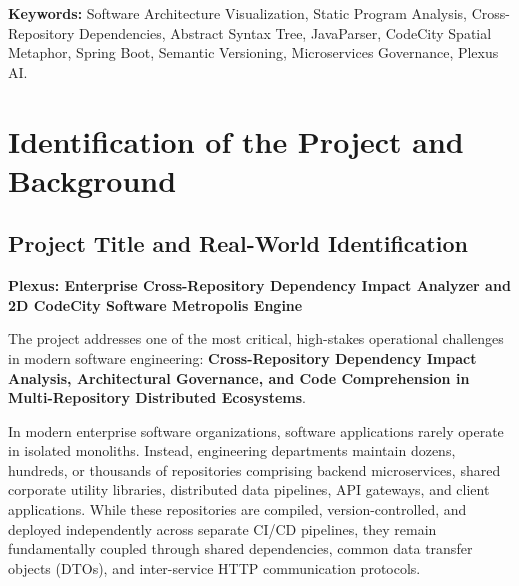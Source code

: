\documentclass[11pt,a4paper,openany]{report}
\begin{document}
\vspace{0.2cm}
\noindent \textbf{Keywords:} Software Architecture Visualization, Static Program Analysis, Cross-Repository Dependencies, Abstract Syntax Tree, JavaParser, CodeCity Spatial Metaphor, Spring Boot, Semantic Versioning, Microservices Governance, Plexus AI.

\vspace{0.3cm}
\tableofcontents

\vspace{0.3cm}
\listoffigures

\vspace{0.3cm}
\listoftables

\clearpage
{}
\setcounter{page}{1}


\chapter{Identification of the Project and Background}

\section{Project Title and Real-World Identification}
\begin{center}
    \textbf{\Large Plexus: Enterprise Cross-Repository Dependency Impact Analyzer and 2D CodeCity Software Metropolis Engine}
\end{center}

The project addresses one of the most critical, high-stakes operational challenges in modern software engineering: \textbf{Cross-Repository Dependency Impact Analysis, Architectural Governance, and Code Comprehension in Multi-Repository Distributed Ecosystems}.

In modern enterprise software organizations, software applications rarely operate in isolated monoliths. Instead, engineering departments maintain dozens, hundreds, or thousands of repositories comprising backend microservices, shared corporate utility libraries, distributed data pipelines, API gateways, and client applications. While these repositories are compiled, version-controlled, and deployed independently across separate CI/CD pipelines, they remain fundamentally coupled through shared dependencies, common data transfer objects (DTOs), and inter-service HTTP communication protocols.
\end{document}
